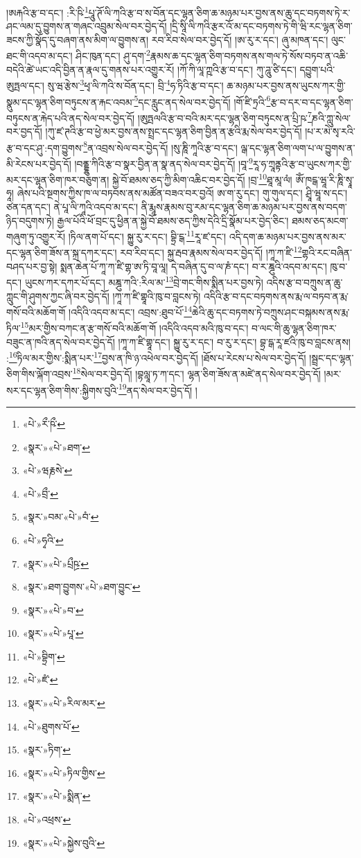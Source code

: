 །ཨརྐའི་རྩ་བ་དང་། :རི་ཥི་\footnote{«པེ་»རྀ་ཥྀ་}པཱུ་ཊོ་ལི་ཀའི་རྩ་བ་ས་བོན་དང་ལྷན་ཅིག་ཆ་མཉམ་པར་བྱས་ནས་ཆུ་དང་བཏགས་ཏེ་ར་ཤང་ལམ་དུ་བྱུགས་ན་གཞང་འབྲུམ་སེལ་བར་བྱེད་དོ། །དྲི་སཱི་ལི་ཀའི་རྩར་འོ་མ་དང་བཏགས་ཏེ་གི་ཝི་རང་ལྷན་ཅིག་ཟངས་ཀྱི་སྣོད་དུ་བཞག་ནས་མིག་ལ་བྱུགས་ན། རབ་རིབ་སེལ་བར་བྱེད་དོ། །ཨ་རུ་ར་དང་། ཞུ་མཁན་དང་། ལུང་ཐང་གི་འདབ་མ་དང་། ཤིང་ཁུན་དང་། ཤུ་དག་\footnote{«སྣར་»«པེ་»ཐག་}རྣམས་ཆ་དང་ལྷན་ཅིག་བཏགས་ནས་གལ་ཏེ་སོས་བཏབ་ན་འཆི་བདེའི་ཚེ་ཡང་འདི་བྱིན་ན་རྣལ་དུ་གནས་པར་འགྱུར་རོ། །ཀོ་ཀི་ལཱ་ཀྵའི་རྩ་བ་དང་། ཀུ་ཌཱུ་ཙི་དང་། དབྱུག་པའི་ཨུཏྤལ་དང་། སུ་ཝ་རྩེས་\footnote{«པེ་»ཝརྞསེ་}ཕྭ་ལི་ཀའི་ས་བོན་དང་། བྲི་\footnote{«པེ་»བྲྀ་}ཧ་ཏིའི་རྩ་བ་དང་། ཆ་མཉམ་པར་བྱས་ནས་ཡུངས་ཀར་གྱི་སྣུམ་དང་ལྷན་ཅིག་བཏུངས་ན་རྐང་འབམ་\footnote{«སྣར་»བམ་«པེ་»བཾ་}དང་རླུང་ནད་སེལ་བར་བྱེད་དོ། །གོ་ཛི་ཏྲའི་\footnote{«པེ་»ཧྭའི་}རྩ་བ་དར་བ་དང་ལྷན་ཅིག་བཏུངས་ན་རྐེད་པའི་ནད་སེལ་བར་བྱེད་དོ། །ཨུཏྤལའི་རྩ་བ་བའི་མར་དང་ལྷན་ཅིག་བཏུངས་ན་པྲི་ཥ་\footnote{«སྣར་»«པེ་»པྲྀཥྲ་}ཎའི་ཀླུ་སེལ་བར་བྱད་དོ། །ཀུ་ཛ་ཊའི་རྩ་བ་ཕྱེ་མར་བྱས་ནས་སྤྲང་དང་ལྷན་ཅིག་བྱིན་ན་རྩའི་རྨ་སེལ་བར་བྱེད་དོ། །པ་ར་མེ་སྭ་རའི་རྩ་བ་དང་ཤུ་:དག་བྱུགས་\footnote{«སྣར་»ཐག་བྱུགས་«པེ་»ཐག་བྱུང་}ན་འབྲས་སེལ་བར་བྱེད་དོ། །སུ་ཎཱི་ཀཱའི་རྩ་བ་དང་། ལྒ་དང་ལྷན་ཅིག་ལག་པ་ལ་བྱུགས་ན་མི་རེངས་པར་བྱེད་དོ། །བནྡྷུ་ཀིའི་རྩ་བ་སྣར་བྱིན་ན་སྣ་ནད་སེལ་བར་བྱེད་དོ། །བཱ་\footnote{«སྣར་»«པེ་»བ་}རཱ་ཧ་ཀྲཱནྟའི་རྩ་བ་ཡུངས་ཀར་གྱི་མར་དང་ལྷན་ཅིག་ཁར་བཅུག་ན། སྐྱེ་བོ་ཐམས་ཅད་ཀྱི་མིག་འཆིང་བར་བྱེད་དོ། །བྲ་\footnote{«སྣར་»«པེ་»པཱ་}ཐཱ་མཱ་ལཾ། ཨོཾ་ཁངྒ་ཝཱ་རི་ཎཱི་སྭཱ་ཧཱ། ཞེས་པའི་སྔགས་ཀྱིས་ཁ་ལ་བཏབས་ནས་མཚོན་བཟའ་བར་བྱའོ། ཨ་ག་རུ་དང་། གུ་གུལ་དང་། ཤྲཱི་ཝཱ་ས་དང་། ཙན་དན་དང་། ནེ་པཱ་ལི་ཀཱའི་འདབ་མ་དང་། ནི་རྨཱས་རྣམས་བུ་རམ་དང་ལྷན་ཅིག་ཆ་མཉམ་པར་བྱས་ནས་བདག་ཉིད་བདུགས་ཏེ། རྒྱལ་པོའི་ཕོ་བྲང་དུ་ཕྱིན་ན་སྐྱེ་བོ་ཐམས་ཅད་ཀྱིས་དེའི་དྲི་སྣོམ་པར་བྱེད་ཅིང་། ཐམས་ཅད་མངག་གཞུག་ཏུ་འགྱུར་རོ། །ཏིལ་ནག་པོ་དང་། སྐྱུ་རུ་ར་དང་། བྷྲི་ངྒ་\footnote{«པེ་»བྷྲིག་}རཱ་ཛ་དང་། འདི་དག་ཆ་མཉམ་པར་བྱས་ནས་མར་དང་ལྷན་ཅིག་ཟོས་ན་སྐྲ་དཀར་དང་། རབ་རིབ་དང་། སྐྱ་རྦབ་རྣམས་སེལ་བར་བྱེད་དོ། །ཀཱ་ཀ་ཛི་\footnote{«པེ་»ཛཾ་}གྷའི་རང་བཞིན་བཤད་པར་བྱ་སྟེ། སྨན་ཆེན་པོ་ཀཱ་ཀ་ཛི་གྷ་ཨ་ཏི་བཱ་ལཱ། དེ་བཞིན་དུ་བ་ལ་ཎཾ་དང་། བ་ར་ཎྜུའི་འདབ་མ་དང་། ཁུ་བ་དང་། ཡུངས་ཀར་དཀར་པོ་དང་། མཎྜུ་ཀའི་:རིལ་མ་\footnote{«སྣར་»«པེ་»རིལ་མར་}བྲེ་གང་གིས་སྨིན་པར་བྱས་ཏེ། འདིས་རྩ་བ་བཀྲུས་ན་ཆུ་ཀླུང་གི་ཤུགས་ཀྱང་ཞི་བར་བྱེད་དོ། །ཀཱ་ཀ་ཛི་གྷཱའི་ཁུ་བ་བླངས་ཏེ། འདིའི་རྩ་བ་དང་བཏགས་ནས་རྨ་ལ་བཏབ་ན་རྨ་གསོ་བའི་མཆོག་གོ །འདིའི་འདབ་མ་དང་། འབྲས་:ཐུབ་པོ་\footnote{«པེ་»ཐུགས་པོ་}ཆེའི་ཆུ་དང་བཏགས་ཏེ་བཀྲུས་ཤང་བསྐམས་ནས་རྨ་ཏིལ་\footnote{«སྣར་»ཏིག་}མར་གྱིས་བཀང་ན་རྩ་གསོ་བའི་མཆོག་གོ །འདིའི་འདབ་མའི་ཁུ་བ་དང་། བ་ལང་གི་ཆུ་ལྷན་ཅིག་ཁར་བཟུང་ན་ཁའི་ནད་སེལ་བར་བྱེད་དོ། །ཀཱ་ཀ་ཛི་གྷཱ་དང་། སྐྱུ་རུ་ར་དང་། བ་རུ་ར་དང་། བྷྲ་དྒ་རཱ་ཛའི་ཁུ་བ་བླངས་ནས། :\footnote{«སྣར་»«པེ་»ཏིལ་གྱིས་}ཏིལ་མར་གྱིས་:སྨིན་པར་\footnote{«སྣར་»«པེ་»སྨིན་}བྱས་ན་ཁི་ཉ་འཕེལ་བར་བྱེད་དོ། །ཐོས་པ་རེངས་པ་སེལ་བར་བྱེད་དོ། །སྦྲང་དང་ལྷན་ཅིག་གིས་ལྐོག་འབྲས་\footnote{«པེ་»འཕྲས་}སེལ་བར་བྱེད་དོ། །བྷལླཱ་ཏ་ཀ་དང་། ལྷན་ཅིག་ཟོས་ན་མཛེ་ནད་སེལ་བར་བྱེད་དོ། །མར་སར་དང་ལྷན་ཅིག་གིས་:སྐྱིགས་བུའི་\footnote{«སྣར་»«པེ་»སྐྱེས་བུའི་}ནད་སེལ་བར་བྱེད་དོ། །
